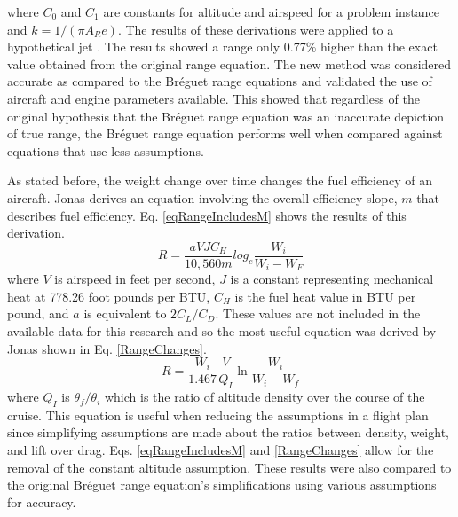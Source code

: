 where $C_0$ and $C_1$ are constants for altitude and airspeed for a problem instance and $k = 1/(\pi A_R e)$. The results of these derivations were applied to a hypothetical jet \cite{Jonas}. The results showed a range only 0.77\% higher than the exact value obtained from the original range equation. The new method was considered accurate as compared to the Br\'eguet range equations and validated the use of aircraft and engine parameters available. This showed that regardless of the original hypothesis that the Br\'eguet range equation was an inaccurate depiction of true range, the Br\'eguet range equation performs well when compared against equations that use less assumptions.\par
As stated before, the weight change over time changes the fuel efficiency of an aircraft. Jonas \cite{Jonas} derives an equation involving the overall efficiency slope, $m$ that describes fuel efficiency. Eq. \ref{eqRangeIncludesM} shows the results of this derivation.
\begin{equation}
    R = \dfrac{aVJC_H}{10,560m}log_e\dfrac{W_i}{W_i-W_F}
    \label{eqRangeIncludesM}
\end{equation}
where $V$ is airspeed in feet per second, $J$ is a constant representing mechanical heat at 778.26 foot pounds per BTU, $C_H$ is the fuel heat value in BTU per pound, and $a$ is equivalent to $2C_L/C_D$. These values are not included in the available data for this research and so the most useful equation was derived by Jonas \cite{Jonas} shown in Eq. \ref{RangeChanges}.
\begin{equation}
    R = \dfrac{W_i}{1.467}\dfrac{V}{Q_I}\ln\dfrac{W_i}{W_i-W_f}
    \label{RangeChanges}
\end{equation}
where $Q_I$ is $\theta_f/\theta_i$ which is the ratio of altitude density over the course of the cruise. This equation is useful when reducing the assumptions in a flight plan since simplifying assumptions are made about the ratios between density, weight, and lift over drag. Eqs. \ref{eqRangeIncludesM} and \ref{RangeChanges} allow for the removal of the constant altitude assumption. These results were also compared to the original Br\'eguet range equation's simplifications using various assumptions for accuracy. \par
